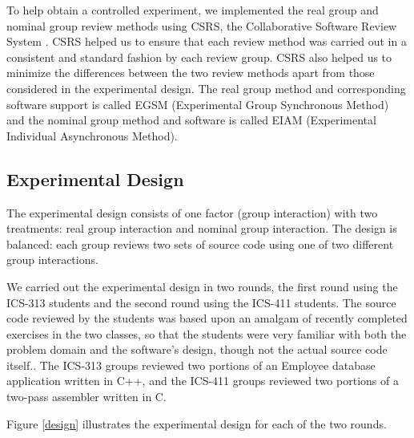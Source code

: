 To help obtain a controlled experiment, we implemented the real group and
nominal group review methods using CSRS, the Collaborative Software Review
System \cite{Johnson94}.  CSRS helped us to ensure that each review method
was carried out in a consistent and standard fashion by each review group.
CSRS also helped us to minimize the differences between the two review
methods apart from those considered in the experimental design. The real
group method and corresponding software support is called EGSM
(Experimental Group Synchronous Method) and the nominal group method and
software is called EIAM (Experimental Individual Asynchronous Method).


\subsection{Experimental Design}

The experimental design consists of one factor (group interaction) with two
treatments: real group interaction and nominal group interaction.  The
design is balanced: each group reviews two sets of source code using one of
two different group interactions.

We carried out the experimental design in two rounds, the first round using
the ICS-313 students and the second round using the ICS-411 students. The
source code reviewed by the students was based upon an amalgam of recently
completed exercises in the two classes, so that the students were very
familiar with both the problem domain and the software's design, though not
the actual source code itself.. The ICS-313 groups reviewed two portions of
an Employee database application written in C++, and the ICS-411 groups
reviewed two portions of a two-pass assembler written in C.

Figure \ref{design} illustrates the experimental design 
for each of the two rounds. 

